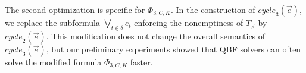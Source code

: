 \documentclass[runningheads]{llncs}
\newcommand{\mks}{\mathit{mks}}
\newcommand{\rem}{\mathit{nm}}
\newcommand{\mcycle}{\mathit{cycle}}
\newcommand{\Te}{T_{\vec{e}}}
\newcommand{\mA}{\mathcal{A}}
\begin{document}
The second optimization is specific for $\Phi_{3,C,K}$. In the
construction of $\mcycle_3(\vec{e})$, we replace the subformula
$\bigvee_{t\in\delta}e_t$ enforcing the nonemptiness of $\Te$ by
$\mcycle_2(\vec{e})$. This modification does not change the overall
semantics of $\mcycle_3(\vec{e})$, but our preliminary experiments
showed that QBF solvers can often solve the modified formula
$\Phi_{3,C,K}$ faster.




\end{document}
